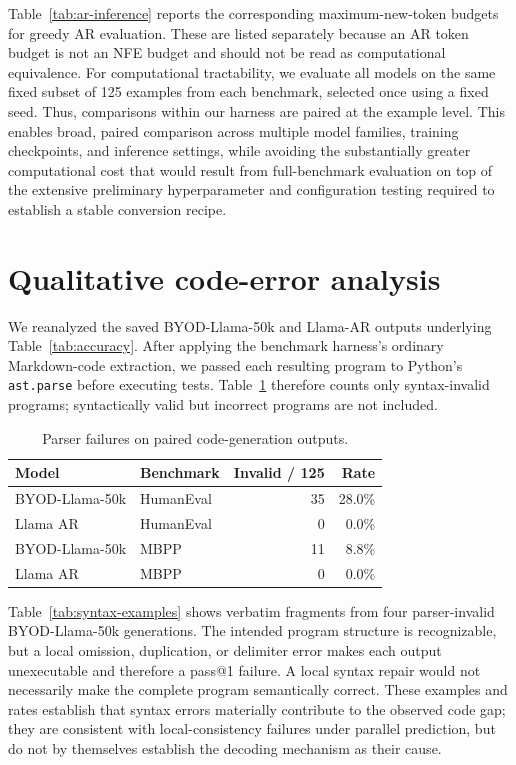 \documentclass{article}
\begin{document}
Table~\ref{tab:ar-inference} reports the corresponding maximum-new-token budgets for greedy AR evaluation. These are listed separately because an AR token budget is not an NFE budget and should not be read as computational equivalence. For computational tractability, we evaluate all models on the same fixed subset of 125 examples from each benchmark, selected once using a fixed seed. Thus, comparisons within our harness are paired at the example level. This enables broad, paired comparison across multiple model families, training checkpoints, and inference settings, while avoiding the substantially greater computational cost that would result from full-benchmark evaluation on top of the extensive preliminary hyperparameter and configuration testing required to establish a stable conversion recipe.

\section{Qualitative code-error analysis}
\label{app:code-errors}

We reanalyzed the saved BYOD-Llama-50k and Llama-AR outputs underlying Table~\ref{tab:accuracy}. After applying the benchmark harness's ordinary Markdown-code extraction, we passed each resulting program to Python's \texttt{ast.parse} before executing tests. Table~\ref{tab:syntax-errors} therefore counts only syntax-invalid programs; syntactically valid but incorrect programs are not included.

\begin{table}[h]
\caption{Parser failures on paired code-generation outputs.}
\label{tab:syntax-errors}
\centering
\small
\begin{tabular}{llrr}
\toprule
Model & Benchmark & Invalid / 125 & Rate \\
\midrule
BYOD-Llama-50k & HumanEval & 35 & 28.0\% \\
Llama AR & HumanEval & 0 & 0.0\% \\
BYOD-Llama-50k & MBPP & 11 & 8.8\% \\
Llama AR & MBPP & 0 & 0.0\% \\
\bottomrule
\end{tabular}
\end{table}

Table~\ref{tab:syntax-examples} shows verbatim fragments from four parser-invalid BYOD-Llama-50k generations. The intended program structure is recognizable, but a local omission, duplication, or delimiter error makes each output unexecutable and therefore a pass@1 failure. A local syntax repair would not necessarily make the complete program semantically correct. These examples and rates establish that syntax errors materially contribute to the observed code gap; they are consistent with local-consistency failures under parallel prediction, but do not by themselves establish the decoding mechanism as their cause.
\end{document}
